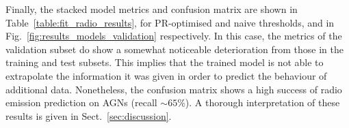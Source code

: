 \documentclass{aa}
\begin{document}
\begin{table}
\setlength{\tabcolsep}{3pt}
\caption{Resulting metrics of the radio detection model on the training, test, and validation subsets using two different threshold values, as explained in Sect.~\ref{sec:results_radio}. HETDEX and Stripe 82 pipeline results shown as part of the discussion in Sect.~\ref{sec:results_prediction_pipeline}.}             %
\label{table:fit_radio_results}      %
\centering                          %
\end{table}

Finally, the stacked model metrics and confusion matrix are shown in Table~\ref{table:fit_radio_results}, for PR-optimised and naive thresholds, and in  Fig.~\ref{fig:results_models_validation} respectively. 
In this case, 
the metrics of the validation subset do show a somewhat noticeable deterioration from those in the training and test subsets. This implies that the trained model is not able to extrapolate the information it was given in order to predict the behaviour of additional data.  Nonetheless, the confusion matrix shows a high success of radio emission prediction on AGNs (recall ${\sim} 65 \%$). A thorough interpretation of these results is given in Sect.~\ref{sec:discussion}.
\end{document}
